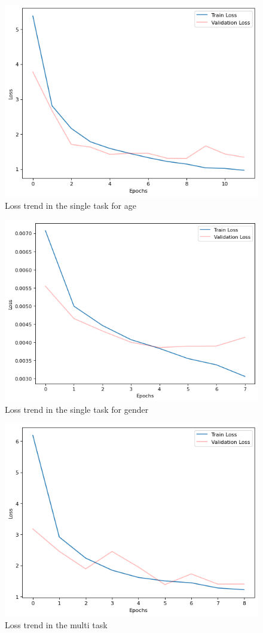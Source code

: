 \begin{figure}[htbp]
    \centerline{\includegraphics[width=.45\textwidth]{images/training/loss-single-age.png}}
    \caption{Loss trend in the single task for age}
    \label{1loss}
\end{figure}
\begin{figure}[htbp]
    \centerline{\includegraphics[width=.45\textwidth]{images/training/loss-single-gender.png}}
    \caption{Loss trend in the single task for gender}
    \label{2loss}
\end{figure}
\begin{figure}[htbp]
    \centerline{\includegraphics[width=.45\textwidth]{images/training/loss-multi.png}}
    \caption{Loss trend in the multi task}
    \label{3loss}
\end{figure}

